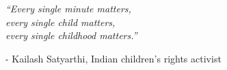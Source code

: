 \clearpage
\pagestyle{empty}  %

\null



\textit{
	\centering
   ``Every single minute matters,\\
   every single child matters,\\
   every single childhood matters.''\\
}
\begin{flushright}
    - Kailash Satyarthi, Indian children's rights activist
\end{flushright}


\vfill\vfill\vfill\vfill\vfill\null
